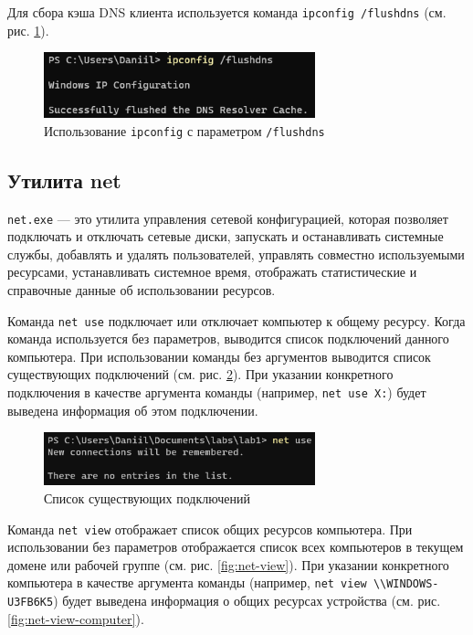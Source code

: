 \documentclass[a4paper, 14pt]{extarticle}
\begin{document}
Для сбора кэша DNS клиента используется команда \texttt{ipconfig /flushdns}
(см. рис. \ref{fig:ipconfig-flushdns}).

\begin{figure}[H]
  \centering
  \includegraphics[width=0.7\textwidth]{images/ipconfig/flushdns.png}
  \caption{Использование \texttt{ipconfig} с параметром \texttt{/flushdns}}
  \label{fig:ipconfig-flushdns}
\end{figure}

\subsection{Утилита net}

\texttt{net.exe} --- это утилита управления сетевой конфигурацией, которая
позволяет подключать и отключать сетевые диски, запускать и останавливать
системные службы, добавлять и удалять пользователей, управлять совместно
используемыми ресурсами, устанавливать системное время, отображать
статистические и справочные данные об использовании ресурсов.

Команда \texttt{net use} подключает или отключает компьютер к общему ресурсу.
Когда команда используется без параметров, выводится список подключений данного
компьютера. При использовании команды без аргументов выводится список
существующих подключений (см. рис. \ref{fig:net-use}). При указании конкретного
подключения в качестве аргумента команды (например, \texttt{net use X:}) будет
выведена информация об этом подключении.

\begin{figure}[H]
  \centering
  \includegraphics[width=0.7\textwidth]{images/net/use.png}
  \caption{Список существующих подключений}
  \label{fig:net-use}
\end{figure}

Команда \texttt{net view} отображает список общих ресурсов компьютера. При
использовании без параметров отображается список всех компьютеров в текущем
домене или рабочей группе (см. рис. \ref{fig:net-view}). При указании
конкретного компьютера в качестве аргумента команды (например, \texttt{net view
  \textbackslash\textbackslash WINDOWS-U3FB6K5}) будет выведена информация о
общих ресурсах устройства (см. рис. \ref{fig:net-view-computer}).
\end{document}

